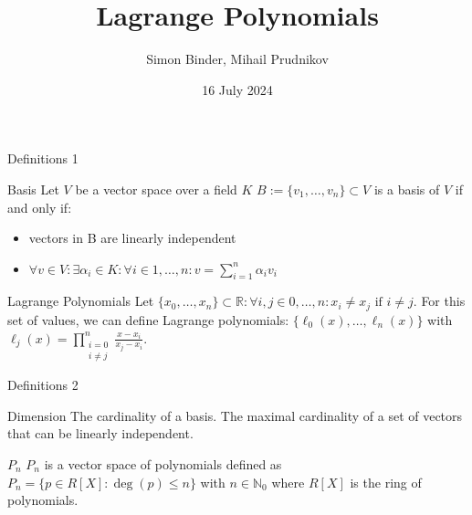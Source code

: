 \documentclass[8pt]{beamer}
\title{Lagrange Polynomials}
\date{16 July 2024}
\author{Simon Binder, Mihail Prudnikov}
\begin{document}
	\begin{frame}[plain]
		\maketitle
	\end{frame}
	
	\begin{frame}{Definitions 1}
		\begin{block}{Basis}
			Let $V$ be a vector space over a field $K$ $B :=\{ v_1, \ldots, v_n\}\subset V $ is a basis of $V$ if and only if:
			\begin{itemize}
				\item vectors in B are linearly independent
				\item
				 $\forall v \in V: \exists\alpha_i \in K:\forall i\in 1,\ldots,n:  v = \sum_{i=1}^{n}\alpha_i v_i$ 
			\end{itemize}\cite{basis}
		\end{block}
		\begin{block}{Lagrange Polynomials}
			Let $\{x_0, \ldots, x_n \} \subset \mathbb{R}: \forall i,j \in 0, \ldots ,n: x_i \neq x_j \text{ if } i \neq j$. For this set of values, we can define Lagrange polynomials: $\{\ell_0(x), \ldots, \ell_n(x)\}$ with \\ $\ell_j(x) = 
			\displaystyle \prod_{\substack{i= 0 \\ i \neq j }}^{n}\frac{x - x_i}{x_j - x_i}$. \cite{lagrange}
		\end{block}
	\end{frame}
	
	\begin{frame}{Definitions 2}
		\begin{block}{Dimension}
			The cardinality of a basis. The maximal cardinality of a set of vectors that can be linearly independent. \cite{basis}
		\end{block}
		\begin{block}{$P_n$}
			$P_n$ is a vector space of polynomials defined as $P_n = \{p \in R[X] : \deg(p) \leq n \}$ with $n \in \mathbb{N}_0$ where $R[X]$ is the ring of polynomials.\cite{lagrange}
		\end{block}
	\end{frame}
	
\end{document}
